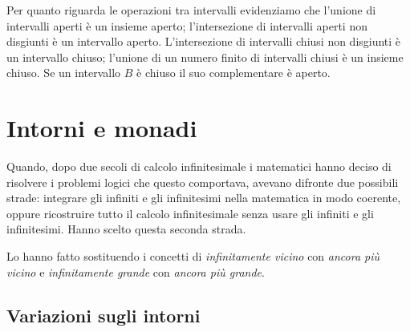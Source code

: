 Per quanto riguarda le operazioni tra intervalli evidenziamo che l'unione 
di intervalli aperti è un insieme aperto; 
l'intersezione di intervalli aperti non disgiunti è un intervallo aperto. 
L'intersezione di intervalli chiusi non disgiunti è un intervallo chiuso; 
l'unione di un numero finito di intervalli chiusi è un insieme chiuso. 
Se un intervallo \(B\) è chiuso il suo complementare è aperto.

\section{Intorni e monadi}
\label{sec:topologiaintorni}

Quando, dopo due secoli di calcolo infinitesimale i matematici hanno deciso 
di risolvere i problemi logici che questo comportava, avevano difronte due 
possibili strade: integrare gli infiniti e gli infinitesimi nella matematica 
in modo coerente, oppure ricostruire tutto il calcolo infinitesimale senza 
usare gli infiniti e gli infinitesimi. 
Hanno scelto questa seconda strada.

Lo hanno fatto sostituendo i concetti di \emph{infinitamente vicino} con 
\emph{ancora più vicino} e \emph{infinitamente grande} con 
\emph{ancora più grande}. 


\subsection{Variazioni sugli intorni}

